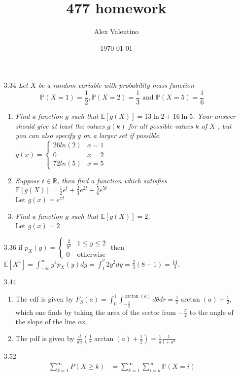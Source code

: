 \documentclass[12pt, letterpaper]{article}
\date{\today}
\author{Alex Valentino}
\title{477 homework}
\newcommand{\R}{\mathbb{R}}
\newcommand{\Pro}{\mathbb{P}}
\begin{document}
\begin{enumerate}
	\item[3.34]\textit{Let $X$ be a random variable with probability mass function$$
\Pro (X = 1) = \frac{1}{
2} , \Pro (X = 2) = \frac{1
}{3} \text{ and } \Pro (X = 5) = \frac{1}
{6}$$}
\begin{enumerate}
	\item \textit{Find a function $g$ such that $\mathbb{E}[g(X )] = 1
3 \ln 2 + 1
6 \ln 5$. Your answer should
give at least the values $g(k)$ for all possible values $k$ of $X$ , but you can also
specify $g$ on a larger set if possible.}\\
	$g(x) = \begin{cases} 26 ln(2) & x=1\\ 0 & x=2\\ 72ln(5) & x=5  \end{cases}$
	\item \textit{Suppose $t \in \R$, then find a function which satisfies
	$\mathbb{E}[g(X)] = \frac{1}{2}e^t + \frac{2}{3}e^{2t} + \frac{5}{6}e^{5t}$}\\
	Let $g(x) = e^{xt}$
	\item \textit{Find a function $g$ such that $\mathbb{E}[g(X )] = 2$.}\\
	Let $g(x) = 2$
\end{enumerate} 
	\item[3.36] if $p_X(y) = \begin{cases} \frac{2}{y^2} & 1 \leq y \leq 2\\
	0 &  \text{otherwise}\end{cases}$ then 
	$\mathbb{E}[X^4] = \int_{-\infty}^\infty y^4 p_X(y) dy = 
	\int_1^2 2y^2dy = \frac{2}{3}(8 - 1) = \frac{14}{3}.$
	\item[3.44] 
	\begin{enumerate}
		\item The cdf is given by $F_S(a) = \int_0^1 \int_{-\frac{\pi}{2}}^{\arctan(a)} d\theta dr = \frac{1}{\pi}\arctan(a) + \frac{1}{2}$, which one finds by taking the area of the sector from $-\frac{\pi}{2}$ to the angle of the slope of the line $ax$.  
		\item The pdf is given by $\frac{d}{da} (\frac{1}{\pi}\arctan(a) + \frac{1}{2}) = \frac{1}{\pi} \frac{1}{1+a^2}$
	\end{enumerate}
	\item[3.52]  
	\begin{align*}
		\sum_{k=1}^\infty P(X \geq k) &= \sum_{k=1}^\infty \sum_{i=k}^\infty \Pro(X=i) \\

\end{align*}
\end{enumerate}
\end{document}
